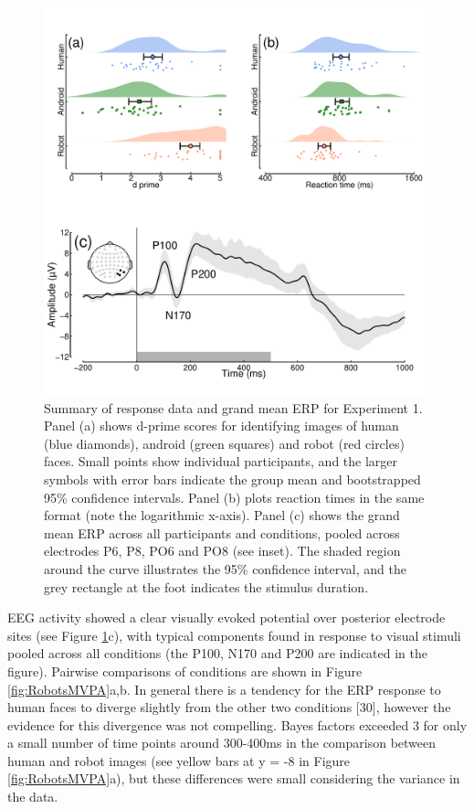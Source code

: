 \documentclass[
]{article}
\begin{document}
\begin{figure}

{\centering \includegraphics{Figures/RobotsData} 

}

\caption{Summary of response data and grand mean ERP for Experiment 1. Panel (a) shows d-prime scores for identifying images of human (blue diamonds), android (green squares) and robot (red circles) faces. Small points show individual participants, and the larger symbols with error bars indicate the group mean and bootstrapped 95\% confidence intervals. Panel (b) plots reaction times in the same format (note the logarithmic x-axis). Panel (c) shows the grand mean ERP across all participants and conditions, pooled across electrodes P6, P8, PO6 and PO8 (see inset). The shaded region around the curve illustrates the 95\% confidence interval, and the grey rectangle at the foot indicates the stimulus duration.}\label{fig:RobotsData}
\end{figure}

EEG activity showed a clear visually evoked potential over posterior electrode sites (see Figure \ref{fig:RobotsData}c), with typical components found in response to visual stimuli pooled across all conditions (the P100, N170 and P200 are indicated in the figure). Pairwise comparisons of conditions are shown in Figure \ref{fig:RobotsMVPA}a,b. In general there is a tendency for the ERP response to human faces to diverge slightly from the other two conditions {[}30{]}, however the evidence for this divergence was not compelling. Bayes factors exceeded 3 for only a small number of time points around 300-400ms in the comparison between human and robot images (see yellow bars at y = -8 in Figure \ref{fig:RobotsMVPA}a), but these differences were small considering the variance in the data.
\end{document}

